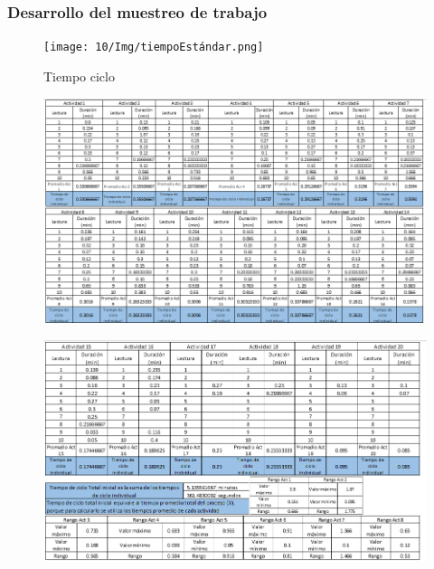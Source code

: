 \subsubsection{Desarrollo del muestreo de trabajo}

\begin{figure}[H]
        \centering
        \texttt{[image: 10/Img/tiempoEstándar.png]}
        \caption{Tiempo ciclo}
        \label{tiempoEstándar}
    \end{figure}

\begin{figure}[H]
        \centering
        \includegraphics[trim = {0mm 0mm 0mm 0mm},clip,scale=0.4]{10/Img/muestreo1.png}
        \label{muestreo1}
    \end{figure}

\begin{figure}[H]
        \centering
        \includegraphics[trim = {0mm 0mm 0mm 0mm},clip,scale=0.4]{10/Img/muestreo2.png}
        \label{muestreo2}
    \end{figure}

